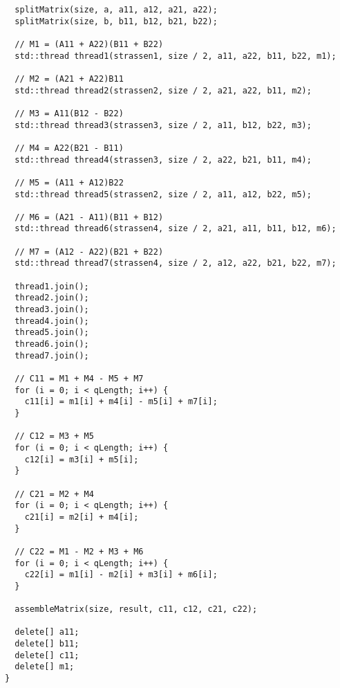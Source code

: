 \documentclass{report}
\begin{document}
\begin{center}
\begin{lstlisting}
  splitMatrix(size, a, a11, a12, a21, a22);
  splitMatrix(size, b, b11, b12, b21, b22);

  // M1 = (A11 + A22)(B11 + B22)
  std::thread thread1(strassen1, size / 2, a11, a22, b11, b22, m1);

  // M2 = (A21 + A22)B11
  std::thread thread2(strassen2, size / 2, a21, a22, b11, m2);

  // M3 = A11(B12 - B22)
  std::thread thread3(strassen3, size / 2, a11, b12, b22, m3);

  // M4 = A22(B21 - B11)
  std::thread thread4(strassen3, size / 2, a22, b21, b11, m4);

  // M5 = (A11 + A12)B22
  std::thread thread5(strassen2, size / 2, a11, a12, b22, m5);

  // M6 = (A21 - A11)(B11 + B12)
  std::thread thread6(strassen4, size / 2, a21, a11, b11, b12, m6);

  // M7 = (A12 - A22)(B21 + B22)
  std::thread thread7(strassen4, size / 2, a12, a22, b21, b22, m7);

  thread1.join();
  thread2.join();
  thread3.join();
  thread4.join();
  thread5.join();
  thread6.join();
  thread7.join();

  // C11 = M1 + M4 - M5 + M7
  for (i = 0; i < qLength; i++) {
    c11[i] = m1[i] + m4[i] - m5[i] + m7[i];
  }

  // C12 = M3 + M5
  for (i = 0; i < qLength; i++) {
    c12[i] = m3[i] + m5[i];
  }

  // C21 = M2 + M4
  for (i = 0; i < qLength; i++) {
    c21[i] = m2[i] + m4[i];
  }

  // C22 = M1 - M2 + M3 + M6
  for (i = 0; i < qLength; i++) {
    c22[i] = m1[i] - m2[i] + m3[i] + m6[i];
  }

  assembleMatrix(size, result, c11, c12, c21, c22);

  delete[] a11;
  delete[] b11;
  delete[] c11;
  delete[] m1;
}
\end{lstlisting}




\end{center}
\end{document}

